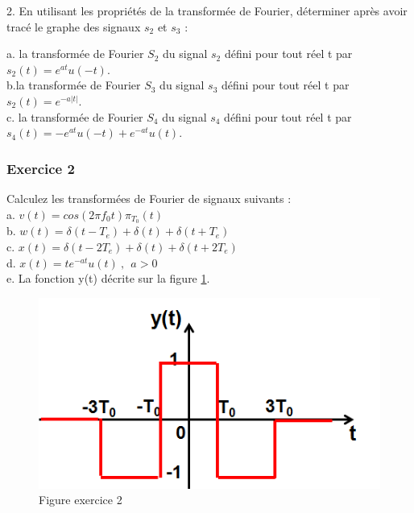 	2. En utilisant les propriétés de la transformée de Fourier, déterminer après avoir tracé le graphe des signaux $s_2$ et $s_3$ :
	
	a. la transformée de Fourier $S_2$ du signal $s_2$ défini pour tout réel t par $s_2(t)=e^{at}u(-t)$.\\
	
	b.la transformée de Fourier $S_3$ du signal $s_3$ défini pour tout réel t par $s_2(t)=e^{-a|t|}$.\\
	
	c. la transformée de Fourier $S_4$ du signal $s_4$ défini pour tout réel t par $s_4(t)=-e^{at}u(-t)+e^{-at}u(t)$.\\
	
	\subsubsection{Exercice 2}
	
	Calculez les transformées de Fourier de signaux suivants :\\
	
	a. $v(t) = cos(2\pi f_0 t)\pi_{T_0}(t)$\\
	
	b. $w(t) = \delta(t-T_e)+\delta(t)+\delta(t+T_e)$\\
	
	c. $x(t) = \delta(t-2T_e)+\delta(t)+\delta(t+2T_e)$\\
	
	d. $x(t) = te^{-at}u(t)~,~~a>0$\\
	
	e. La fonction y(t) décrite sur la figure \ref{Fig:Exo_TF_2}.
	
	\begin{figure}[h!]
		\centering
		\includegraphics[scale=0.5]{images/exo_2_TF.png}
		\caption{Figure exercice 2}	
		\label{Fig:Exo_TF_2} 
	\end{figure}
	
